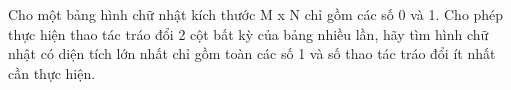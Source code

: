 Cho một bảng hình chữ nhật kích thước M x N chỉ gồm các số 0 và 1. Cho phép thực hiện thao tác tráo đổi 2 cột bất kỳ của bảng nhiều lần, hãy tìm hình chữ nhật có diện tích lớn nhất chỉ gồm toàn các số 1 và số thao tác tráo đổi ít nhất cần thực hiện.